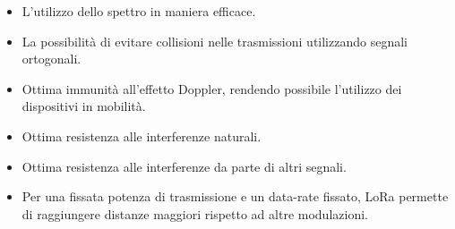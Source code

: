 \begin{itemize}
        \item   L'utilizzo dello spettro in maniera efficace. 
        \item   La possibilità di evitare collisioni nelle trasmissioni
                utilizzando segnali ortogonali.
        \item   Ottima immunità all'effetto Doppler, rendendo possibile
                l'utilizzo dei dispositivi in mobilità.
        \item   Ottima resistenza alle interferenze naturali.  
        \item   Ottima resistenza alle interferenze da parte di altri segnali.
        \item   Per una fissata potenza di trasmissione e un data-rate fissato,
                LoRa permette di raggiungere distanze maggiori rispetto ad altre modulazioni.
\end{itemize}

